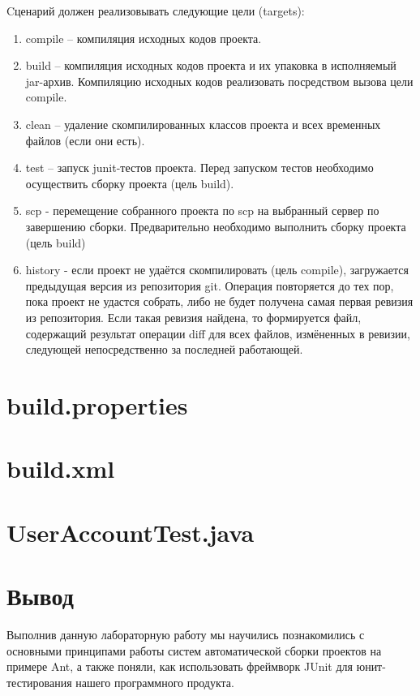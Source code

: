 \documentclass{article}
\begin{document}
Cценарий должен реализовывать следующие цели (targets):
\begin{enumerate}
    \item compile -- компиляция исходных кодов проекта.
    \item build -- компиляция исходных кодов проекта и их 
          упаковка в исполняемый jar-архив. Компиляцию исходных 
          кодов реализовать посредством вызова цели compile.
    \item clean -- удаление скомпилированных классов проекта 
          и всех временных файлов (если они есть).
    \item test -- запуск junit-тестов проекта. Перед запуском 
          тестов необходимо осуществить сборку проекта 
          (цель build).
    \item scp - перемещение собранного проекта по scp на 
          выбранный сервер по завершению сборки. 
          Предварительно необходимо выполнить сборку проекта 
          (цель build)
    \item history - если проект не удаётся скомпилировать 
          (цель compile), загружается предыдущая версия из 
          репозитория git. Операция повторяется до тех пор, 
          пока проект не удастся собрать, либо не будет 
          получена самая первая ревизия из репозитория. 
          Если такая ревизия найдена, то формируется файл, 
          содержащий результат операции diff для всех файлов, 
          измёненных в ревизии, следующей непосредственно за 
          последней работающей.
\end{enumerate}

\section{build.properties}



\section{build.xml}



\section{UserAccountTest.java}



\section{Вывод}

Выполнив данную лабораторную работу мы научились 
познакомились с основными принципами работы 
систем автоматической сборки проектов на примере
Ant, а также поняли, как использовать фреймворк
JUnit для юнит-тестирования нашего программного продукта.
\end{document}
